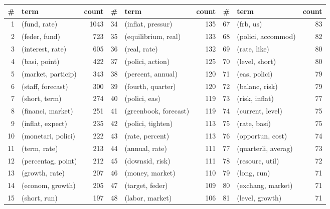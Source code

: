 \begin{tabular}{rlrrlrrlr}
\toprule
  \# &                term &  count &   \# &                   term &  count &   \# &                  term &  count \\
\midrule
  1 &        (fund, rate) &   1043 &  34 &      (inflat, pressur) &    135 &  67 &             (frb, us) &     83 \\
  2 &       (feder, fund) &    723 &  35 &    (equilibrium, real) &    133 &  68 &    (polici, accommod) &     82 \\
  3 &    (interest, rate) &    605 &  36 &           (real, rate) &    132 &  69 &          (rate, like) &     80 \\
  4 &       (basi, point) &    422 &  37 &       (polici, action) &    125 &  70 &        (level, short) &     80 \\
  5 &  (market, particip) &    343 &  38 &      (percent, annual) &    120 &  71 &         (eas, polici) &     79 \\
  6 &   (staff, forecast) &    300 &  39 &      (fourth, quarter) &    120 &  72 &        (balanc, risk) &     79 \\
  7 &       (short, term) &    274 &  40 &          (polici, eas) &    119 &  73 &        (risk, inflat) &     77 \\
  8 &   (financi, market) &    251 &  41 &  (greenbook, forecast) &    119 &  74 &      (current, level) &     75 \\
  9 &    (inflat, expect) &    235 &  42 &      (polici, tighten) &    113 &  75 &          (rate, basi) &     75 \\
 10 &  (monetari, polici) &    222 &  43 &        (rate, percent) &    113 &  76 &      (opportun, cost) &     74 \\
 11 &        (term, rate) &    213 &  44 &         (annual, rate) &    111 &  77 &   (quarterli, averag) &     73 \\
 12 &  (percentag, point) &    212 &  45 &        (downsid, risk) &    111 &  78 &       (resourc, util) &     72 \\
 13 &      (growth, rate) &    207 &  46 &        (money, market) &    110 &  79 &           (long, run) &     71 \\
 14 &    (econom, growth) &    205 &  47 &        (target, feder) &    109 &  80 &     (exchang, market) &     71 \\
 15 &        (short, run) &    197 &  48 &        (labor, market) &    106 &  81 &       (level, growth) &     71 \\

\end{tabular}
